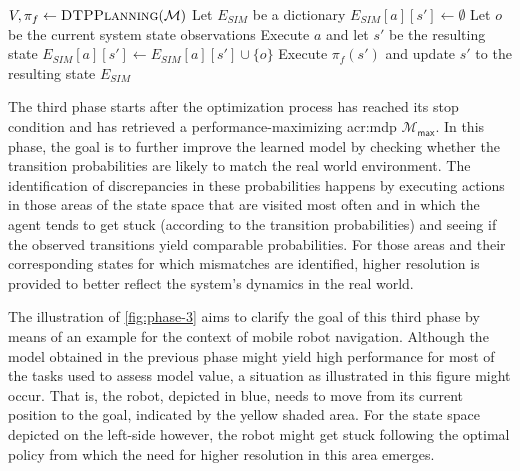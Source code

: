 \begin{algorithm}[t!]
\begin{algorithmic}[1]
			\State $V, \pi_f \gets \textproc{DTPPlanning}(\mathcal{M})$
			\State Let $E_\mathit{SIM}$ be a dictionary
				\State $E_\mathit{SIM}[a][s'] \gets \emptyset$
			\EndFor
				 
				\State Let $o$ be the current system state observations
				\State Execute $a$ and let $s'$ be the resulting state
				\State $E_\mathit{SIM}[a][s'] \gets E_\mathit{SIM}[a][s'] \cup \{o\}$	
				 
					\State Execute $\pi_f(s')$ and update $s'$ to the resulting state
				\EndWhile
			\EndFor
			\State\Return $E_\mathit{SIM}$
		\EndFunction
	\end{algorithmic}
\end{algorithm}

The third phase starts after the optimization process has reached its stop condition and has retrieved a performance-maximizing \acrshort{acr:mdp} $\mathcal{M}_\mathsf{max}$.
In this phase, the goal is to further improve the learned model by checking whether the transition probabilities are likely to match the real world environment.
The identification of discrepancies in these probabilities happens by executing actions in those areas of the state space that are visited most often and in which the agent tends to get stuck (according to the transition probabilities) and seeing if the observed transitions yield comparable probabilities.
For those areas and their corresponding states for which mismatches are identified, higher resolution is provided to better reflect the system's dynamics in the real world.

The illustration of \autoref{fig:phase-3} aims to clarify the goal of this third phase by means of an example for the context of mobile robot navigation.
Although the model obtained in the previous phase might yield high performance for most of the tasks used to assess model value, a situation as illustrated in this figure might occur.
That is, the robot, depicted in blue, needs to move from its current position to the goal, indicated by the yellow shaded area.
For the state space depicted on the left-side however, the robot might get stuck following the optimal policy from which the need for higher resolution in this area emerges.

